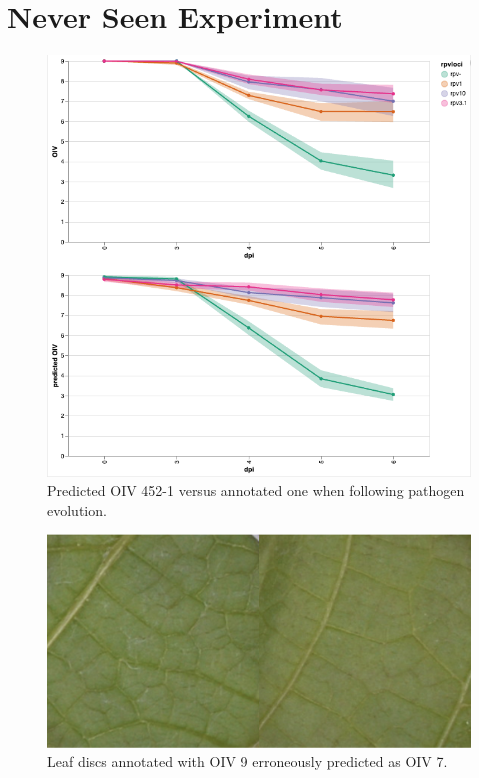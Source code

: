 \documentclass[english]{article}
\begin{document}
\section{Never Seen Experiment}

\begin{figure}[H]
    \centering
    \includegraphics[width=0.9\linewidth]{p_viticola//resources//images/cmp_2023_oiv_evo.png}
    \caption{Predicted OIV 452-1 versus annotated one when following pathogen evolution.}
    \label{fig:newexpprog}
\end{figure}


\begin{figure}[H]
    \centering
    \includegraphics[width=0.9\linewidth]{p_viticola//resources//images/nexexppatcherror.png}
    \caption{Leaf discs annotated with OIV 9 erroneously predicted as OIV 7.}
    \label{fig:newexperror}
\end{figure}
\end{document}
